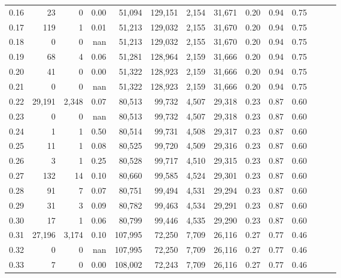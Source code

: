 \begin{tabular}{rrrrrrrrrrrrrr}
0.16 &      23 &      0 &  0.00 &   51,094 &  129,151 &   2,154 &  31,671 &  0.20 &  0.94 &      0.75 \\
0.17 &     119 &      1 &  0.01 &   51,213 &  129,032 &   2,155 &  31,670 &  0.20 &  0.94 &      0.75 \\
0.18 &       0 &      0 &   nan &   51,213 &  129,032 &   2,155 &  31,670 &  0.20 &  0.94 &      0.75 \\
0.19 &      68 &      4 &  0.06 &   51,281 &  128,964 &   2,159 &  31,666 &  0.20 &  0.94 &      0.75 \\
0.20 &      41 &      0 &  0.00 &   51,322 &  128,923 &   2,159 &  31,666 &  0.20 &  0.94 &      0.75 \\
0.21 &       0 &      0 &   nan &   51,322 &  128,923 &   2,159 &  31,666 &  0.20 &  0.94 &      0.75 \\
0.22 &  29,191 &  2,348 &  0.07 &   80,513 &   99,732 &   4,507 &  29,318 &  0.23 &  0.87 &      0.60 \\
0.23 &       0 &      0 &   nan &   80,513 &   99,732 &   4,507 &  29,318 &  0.23 &  0.87 &      0.60 \\
0.24 &       1 &      1 &  0.50 &   80,514 &   99,731 &   4,508 &  29,317 &  0.23 &  0.87 &      0.60 \\
0.25 &      11 &      1 &  0.08 &   80,525 &   99,720 &   4,509 &  29,316 &  0.23 &  0.87 &      0.60 \\
0.26 &       3 &      1 &  0.25 &   80,528 &   99,717 &   4,510 &  29,315 &  0.23 &  0.87 &      0.60 \\
0.27 &     132 &     14 &  0.10 &   80,660 &   99,585 &   4,524 &  29,301 &  0.23 &  0.87 &      0.60 \\
0.28 &      91 &      7 &  0.07 &   80,751 &   99,494 &   4,531 &  29,294 &  0.23 &  0.87 &      0.60 \\
0.29 &      31 &      3 &  0.09 &   80,782 &   99,463 &   4,534 &  29,291 &  0.23 &  0.87 &      0.60 \\
0.30 &      17 &      1 &  0.06 &   80,799 &   99,446 &   4,535 &  29,290 &  0.23 &  0.87 &      0.60 \\
0.31 &  27,196 &  3,174 &  0.10 &  107,995 &   72,250 &   7,709 &  26,116 &  0.27 &  0.77 &      0.46 \\
0.32 &       0 &      0 &   nan &  107,995 &   72,250 &   7,709 &  26,116 &  0.27 &  0.77 &      0.46 \\
0.33 &       7 &      0 &  0.00 &  108,002 &   72,243 &   7,709 &  26,116 &  0.27 &  0.77 &      0.46 \\

\end{tabular}
